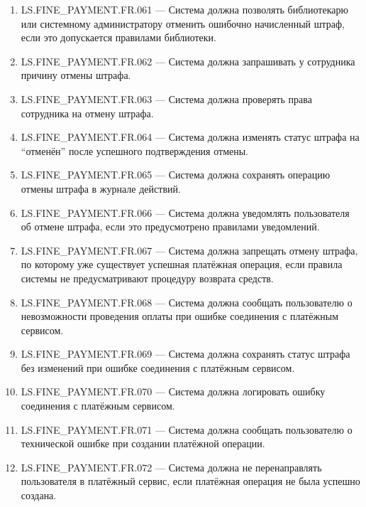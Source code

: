 \documentclass[12pt,a4paper]{article}
\begin{document}
\begin{enumerate}
		\item LS.FINE\_PAYMENT.FR.061 --- Система должна позволять библиотекарю или системному
		администратору отменить ошибочно начисленный штраф, если это допускается
		правилами библиотеки.
		
		\item LS.FINE\_PAYMENT.FR.062 --- Система должна запрашивать у сотрудника причину отмены
		штрафа.
		
		\item LS.FINE\_PAYMENT.FR.063 --- Система должна проверять права сотрудника на отмену штрафа.
		
		\item LS.FINE\_PAYMENT.FR.064 --- Система должна изменять статус штрафа на ``отменён''
		после успешного подтверждения отмены.
		
		\item LS.FINE\_PAYMENT.FR.065 --- Система должна сохранять операцию отмены штрафа в журнале
		действий.
		
		\item LS.FINE\_PAYMENT.FR.066 --- Система должна уведомлять пользователя об отмене штрафа,
		если это предусмотрено правилами уведомлений.
		
		\item LS.FINE\_PAYMENT.FR.067 --- Система должна запрещать отмену штрафа, по которому уже
		существует успешная платёжная операция, если правила системы не предусматривают
		процедуру возврата средств.
		
		\item LS.FINE\_PAYMENT.FR.068 --- Система должна сообщать пользователю о невозможности
		проведения оплаты при ошибке соединения с платёжным сервисом.
		
		\item LS.FINE\_PAYMENT.FR.069 --- Система должна сохранять статус штрафа без изменений при
		ошибке соединения с платёжным сервисом.
		
		\item LS.FINE\_PAYMENT.FR.070 --- Система должна логировать ошибку соединения с платёжным
		сервисом.
		
		\item LS.FINE\_PAYMENT.FR.071 --- Система должна сообщать пользователю о технической ошибке
		при создании платёжной операции.
		
		\item LS.FINE\_PAYMENT.FR.072 --- Система должна не перенаправлять пользователя в платёжный
		сервис, если платёжная операция не была успешно создана.
		

\end{enumerate}
\end{document}
